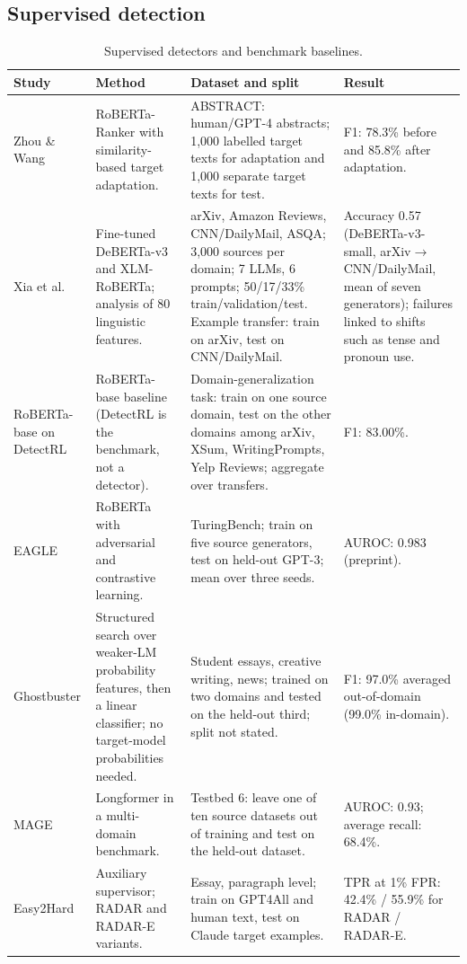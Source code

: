 \documentclass[11pt]{article}
\begin{document}
\subsection{Supervised detection}
\begin{table}[!t]
\centering\scriptsize
\begin{tabularx}{\textwidth}{>{\raggedright\arraybackslash}p{} >{\raggedright\arraybackslash}p{} >{\raggedright\arraybackslash}p{} >{\raggedright\arraybackslash}X}
\toprule
\textbf{Study} & \textbf{Method} & \textbf{Dataset and split} & \textbf{Result}\\
\midrule
Zhou \& Wang \cite{zhou2024crossdomains} & RoBERTa-Ranker with similarity-based target adaptation. & ABSTRACT: human/GPT-4 abstracts; 1,000 labelled target texts for adaptation and 1,000 separate target texts for test. & F1: 78.3\% before and 85.8\% after adaptation.\\
Xia et al. \cite{xia2026explaining} & Fine-tuned DeBERTa-v3 and XLM-RoBERTa; analysis of 80 linguistic features. & arXiv, Amazon Reviews, CNN/DailyMail, ASQA; 3,000 sources per domain; 7 LLMs, 6 prompts; 50/17/33\% train/validation/test. Example transfer: train on arXiv, test on CNN/DailyMail. & Accuracy 0.57 (DeBERTa-v3-small, arXiv$\to$CNN/DailyMail, mean of seven generators); failures linked to shifts such as tense and pronoun use.\\
RoBERTa-base on DetectRL \cite{wu2024detectrl} & RoBERTa-base baseline (DetectRL is the benchmark, not a detector). & Domain-generalization task: train on one source domain, test on the other domains among arXiv, XSum, WritingPrompts, Yelp Reviews; aggregate over transfers. & F1: 83.00\%.\\
EAGLE \cite{bhattacharjee2024eagle} & RoBERTa with adversarial and contrastive learning. & TuringBench; train on five source generators, test on held-out GPT-3; mean over three seeds. & AUROC: 0.983 (preprint).\\
Ghostbuster \cite{verma2024ghostbuster} & Structured search over weaker-LM probability features, then a linear classifier; no target-model probabilities needed. & Student essays, creative writing, news; trained on two domains and tested on the held-out third; split not stated. & F1: 97.0\% averaged out-of-domain (99.0\% in-domain).\\
MAGE \cite{li2024mage} & Longformer in a multi-domain benchmark. & Testbed 6: leave one of ten source datasets out of training and test on the held-out dataset. & AUROC: 0.93; average recall: 68.4\%.\\
Easy2Hard \cite{wu2025easy2hard} & Auxiliary supervisor; RADAR and RADAR-E variants. & Essay, paragraph level; train on GPT4All and human text, test on Claude target examples. & TPR at 1\% FPR: 42.4\% / 55.9\% for RADAR / RADAR-E.\\
\bottomrule
\end{tabularx}
\caption{Supervised detectors and benchmark baselines.}
\label{tab:supervised}
\end{table}
\end{document}
